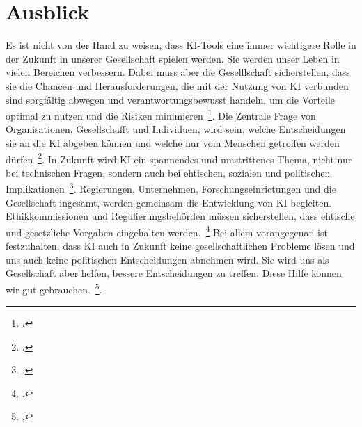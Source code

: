 \newpage
\section{Ausblick} \label{Ausblick}

Es ist nicht von der Hand zu weisen, dass \ac{KI}-Tools eine immer wichtigere Rolle in der Zukunft in unserer Gesellschaft spielen werden. Sie werden unser Leben in vielen Bereichen
verbessern. Dabei muss aber die Geselllschaft sicherstellen, dass sie die Chancen und Herausforderungen, die mit der Nutzung von {KI} verbunden sind sorgfältig abwegen
und verantwortungsbewusst handeln, um die Vorteile optimal zu nutzen und die Risiken minimieren~\footcite[\vglf][]{Robot.2023}. Die Zentrale Frage von Organisationen,
Gesellschafft und Individuen, wird sein, welche Entscheidungen sie an die \ac{KI} abgeben können und welche nur vom Menschen getroffen werden dürfen~\footcite[\vglf][]{Wittpahl.2018}.
In Zukunft wird \ac{KI} ein spannendes und umstrittenes Thema, nicht nur bei technischen Fragen, sondern auch bei ehtischen, sozialen und politischen Implikationen~\footcite[\vglf][]{Robot.2023}.
Regierungen, Unternehmen, Forschungseinrictungen und die Gesellschaft ingesamt, werden gemeinsam die Entwicklung von \ac{KI} begleiten. Ethikkommissionen und Regulierungsbehörden müssen sicherstellen,
dass ehtische und gesetzliche Vorgaben eingehalten werden.~\footcite[\vglf][]{Robot.2023}
Bei allem vorangegenan ist festzuhalten, dass \ac{KI} auch in Zukunft keine gesellschaftlichen Probleme lösen und uns auch keine politischen Entscheidungen abnehmen wird.
Sie wird uns als Gesellschaft aber helfen, bessere Entscheidungen zu treffen. Diese Hilfe können wir gut gebrauchen.~\footcite[\vglf][]{Lenzen.2020}.